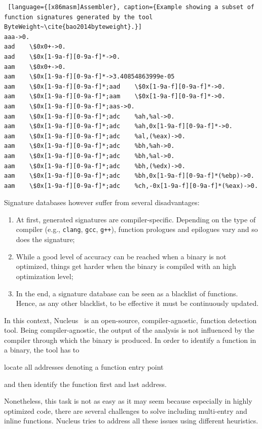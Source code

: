 \documentclass[LaM,binding=0.6cm]{sapthesis}
\begin{document}
\begin{lstlisting} [language={[x86masm]Assembler}, caption={Example showing a subset of function signatures generated by the tool ByteWeight~\cite{bao2014byteweight}.}]
aaa->0.
aad    \$0x0+->0.
aad    \$0x[1-9a-f][0-9a-f]*->0.
aam    \$0x0+->0.
aam    \$0x[1-9a-f][0-9a-f]*->3.40854863999e-05
aam    \$0x[1-9a-f][0-9a-f]*;aad    \$0x[1-9a-f][0-9a-f]*->0.
aam    \$0x[1-9a-f][0-9a-f]*;aam    \$0x[1-9a-f][0-9a-f]*->0.
aam    \$0x[1-9a-f][0-9a-f]*;aas->0.
aam    \$0x[1-9a-f][0-9a-f]*;adc    %ah,%al->0.
aam    \$0x[1-9a-f][0-9a-f]*;adc    %ah,0x[1-9a-f][0-9a-f]*->0.
aam    \$0x[1-9a-f][0-9a-f]*;adc    %al,(%eax)->0.
aam    \$0x[1-9a-f][0-9a-f]*;adc    %bh,%ah->0.
aam    \$0x[1-9a-f][0-9a-f]*;adc    %bh,%al->0.
aam    \$0x[1-9a-f][0-9a-f]*;adc    %bh,(%edx)->0.
aam    \$0x[1-9a-f][0-9a-f]*;adc    %bh,0x[1-9a-f][0-9a-f]*(%ebp)->0.
aam    \$0x[1-9a-f][0-9a-f]*;adc    %ch,-0x[1-9a-f][0-9a-f]*(%eax)->0.
\end{lstlisting}

\noindent
Signature databases however suffer from several disadvantages:
\begin{enumerate}
\item At first, generated signatures are compiler-specific. Depending on the type of compiler (e.g., \texttt{clang}, \texttt{gcc}, \texttt{g++}), function prologues and epilogues vary and so does the signature;
\item While a good level of accuracy can be reached when a binary is not optimized, things get harder when the binary is compiled with an high optimization level;
\item In the end, a signature database can be seen as a blacklist of functions. Hence, as any other blacklist, to be effective it must be continuously updated.
\end{enumerate}
In this context, Nucleus~\cite{andriesse2017compiler} is an open-source, compiler-agnostic, function detection tool. Being compiler-agnostic, the output of the analysis is not influenced by the compiler through which the binary is produced. In order to identify a function in a binary, the tool has to 
\begin{enumerate*}[label=\roman*),itemjoin={,\quad}]
\item locate all addresses denoting a function entry point
\item and then identify the function first and last address.
\end{enumerate*}
Nonetheless, this task is not as easy as it may seem because especially in highly optimized code, there are several challenges to solve including multi-entry and inline functions. Nucleus tries to address all these issues using different heuristics.\\
\end{document}
